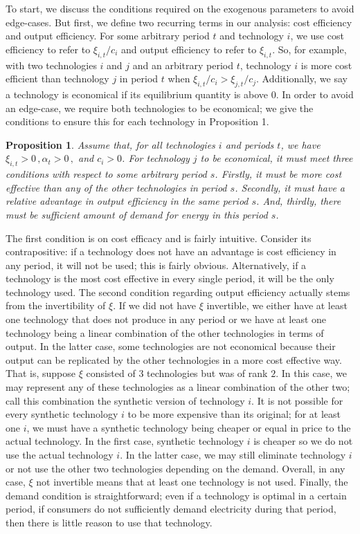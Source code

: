 \documentclass[11pt,a4paper]{extarticle}
\newtheorem{proposition}{Proposition}
\begin{document}
To start, we discuss the conditions required on the exogenous parameters  to avoid edge-cases. But  first, we define two recurring terms in our analysis: cost efficiency and output efficiency. For some arbitrary period $t$ and technology $i$, we use cost efficiency to refer to $\xi_{i,t}/c_i$ and output efficiency to refer to $\xi_{i,t}$. So, for example, with two technologies $i$ and $j$ and an arbitrary period $t$, technology $i$ is more cost efficient than technology $j$ in period $t$ when $\xi_{i,t}/c_i > \xi_{j,t}/c_j$. Additionally, we say a technology is economical if its equilibrium quantity is above 0. In order to avoid an edge-case, we require both technologies to be economical; we give the conditions to ensure this for each technology in Proposition 1. 
\begin{proposition}
	Assume that, for all technologies $i$ and  periods $t$, we have $\xi_{i,t} > 0 \, , \alpha_t > 0 \, ,$ and $ c_i > 0$. For technology $j$ to be economical, it must meet three conditions with respect to some arbitrary period $s$. Firstly, it must be more cost effective than any of the other technologies in period $s$. Secondly, it must have  a relative advantage in output efficiency in the same period $s$. And, thirdly, there must be sufficient amount of demand for energy in this period $s$. 
\end{proposition}
The first condition is on cost efficacy and is fairly intuitive. Consider its contrapositive: if a technology does not have an advantage is cost efficiency in any period, it will not be used; this is fairly obvious. Alternatively, if a technology is the most cost effective in every single period, it will be the only technology used. The second condition regarding output efficiency actually stems from the invertibility of $\xi$. If we did not have $\xi$ invertible, we either have at least one technology that does not produce in any period or we have at least one technology being a linear combination of the other technologies in terms of output. In the latter case, some technologies are not economical because their output can be replicated by the other technologies in a more cost effective way. That is, suppose $\xi$ consisted of 3 technologies but was of rank $2$. In this case, we may represent any of these technologies as a linear combination of the other two; call this combination the synthetic version of technology $i$. It is not possible for every synthetic technology $i$ to be more expensive than its original; for at least one $i$, we must have a synthetic technology being cheaper or equal in price to the actual technology. In the first case, synthetic technology $i$ is cheaper so we do not use the actual technology $i$. In the latter case, we may still eliminate technology $i$ or not use the other two technologies depending on the demand. Overall, in any case, $\xi$ not invertible means that at least one technology is not used. Finally, the demand condition is straightforward; even if a technology is optimal in a certain period, if consumers do not sufficiently demand electricity during that period, then there is little reason to use that technology. 
\end{document}
